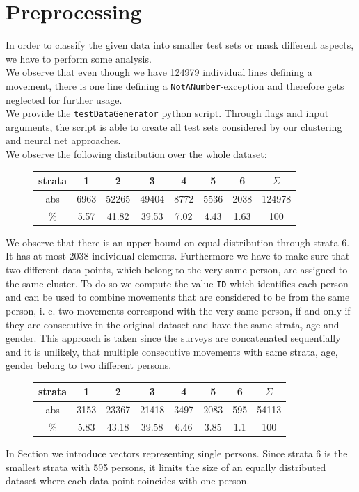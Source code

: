 \documentclass[runningheads]{llncs}
\begin{document}
	
	\section{Preprocessing}\label{sec: proprocessing}
	In order to classify the given data into smaller test sets or mask different aspects, we have to perform some analysis.\\
	We observe that even though we have 124979 individual lines defining a movement, there is one line defining a \texttt{NotANumber}-exception and therefore gets neglected for further usage.	\\
	We provide the \texttt{testDataGenerator} python script. Through flags and input arguments, the script is able to create all test sets considered by our clustering and neural net approaches.\\
	We observe the following distribution over the whole dataset:\\
	\begin{figure}[H]
		\centering
		\setlength\tabcolsep{.2cm}
		\begin{tabular}{c|ccccccc}
			strata &  1   &   2   &   3   &  4   &  5   &  6   & $\Sigma$ \\ \hline
			abs   & 6963 & 52265 & 49404 & 8772 & 5536 & 2038 &  124978  \\
			\%   & 5.57 & 41.82 & 39.53 & 7.02 & 4.43 & 1.63 &   100
		\end{tabular}
		\label{table: distribution normal}
	\end{figure}
	We observe that there is an upper bound on equal distribution through strata 6. It has at most 2038 individual elements.
	Furthermore we have to make sure that  two different data points, which belong to the very same person, are assigned to the same cluster. To do so we compute the value \texttt{ID} which identifies each person and can be used to combine movements that are considered to be from the same person, i. e. two movements correspond with the very same person, if and only if they are consecutive in the original dataset and have the same strata, age and gender. This approach is taken since the surveys are concatenated sequentially and it is unlikely, that multiple consecutive movements with same strata, age, gender belong to two different persons.
	\begin{figure}[H]
		\centering
		\setlength\tabcolsep{.2cm}
		\begin{tabular}{c|ccccccc}
			strata &  1   &   2   &   3   &  4   &  5   &  6  & $\Sigma$ \\ \hline
			abs   & 3153 & 23367 & 21418 & 3497 & 2083 & 595 &  54113   \\
			\%   & 5.83 & 43.18 & 39.58 & 6.46 & 3.85 & 1.1 &   100
		\end{tabular}
	\end{figure}
	In Section  we introduce vectors representing single persons. Since strata 6 is the smallest strata with 595 persons, it limits the size of an equally distributed dataset where each data point coincides with one person.
	
\end{document}
